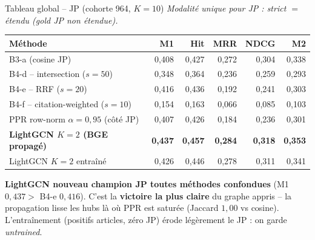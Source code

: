\documentclass[aspectratio=169,10pt]{beamer}
\newcommand{\okbox}[1]{%
  \begin{center}
  \colorbox{green!10}{\parbox{0.92\linewidth}{\centering #1}}
  \end{center}}
\begin{document}
\begin{frame}{Tableau global -- JP (cohorte 964, $K{=}10$)}
  \scriptsize
  \textit{Modalité unique pour JP : strict $=$ étendu (gold JP non étendue).}

  \vspace{0.4em}
  \renewcommand{\arraystretch}{1.2}
  \setlength{\tabcolsep}{6pt}
  \begin{center}
  \begin{tabular}{@{}l | r r r r r@{}}
    \toprule
    \textbf{Méthode} & M1 & Hit & MRR & NDCG & M2 \\
    \midrule
    B3-a (cosine JP)                          & 0,408 & 0,427 & 0,272 & 0,304 & 0,338 \\
    B4-d -- intersection ($s{=}50$) & 0,348 & 0,364 & 0,236 & 0,259 & 0,293 \\
    B4-e -- RRF ($s{=}20$)         & 0,416 & 0,436 & 0,192 & 0,241 & 0,303 \\
    B4-f -- citation-weighted ($s{=}10$) & 0,154 & 0,163 & 0,066 & 0,085 & 0,103 \\
    PPR row-norm $\alpha=0{,}95$ (côté JP)    & 0,407 & 0,426 & 0,184 & 0,236 & 0,301 \\
    \midrule
    \rowcolor{green!10}
    \textbf{LightGCN $K{=}2$ (BGE propagé)}   & \textbf{0,437} & \textbf{0,457} & \textbf{0,284} & \textbf{0,318} & \textbf{0,353} \\
    \rowcolor{green!10}
    LightGCN $K{=}2$ entraîné                 & 0,426 & 0,446 & 0,278 & 0,311 & 0,341 \\
    \bottomrule
  \end{tabular}
  \end{center}

  \vspace{0.5em}
  \okbox{\scriptsize \textbf{LightGCN nouveau champion JP toutes méthodes confondues}
  (M1 $0{,}437 >$ B4-e $0{,}416$). C'est la \textbf{victoire la plus claire} du graphe appris
  -- la propagation lisse les hubs là où PPR est saturée (Jaccard $1{,}00$ vs cosine).
  L'entraînement (positifs articles, zéro JP) érode légèrement le JP : on garde \emph{untrained}.}
\end{frame}
\end{document}
